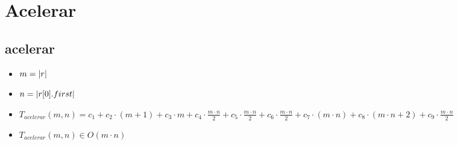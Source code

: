 \documentclass{article}
\begin{document}
    \section*{Acelerar}

    \subsection*{acelerar}

    \begin{minipage}{0.70\textwidth}
        
    \end{minipage}
    \hfill
    \begin{minipage}{0.25\textwidth}
    \end{minipage}

    \begin{itemize}
        \item $m = |r|$
        \item $n = |r[0].first|$
        \item $T_{acelerar}(m, n) = c_1 + 
                                    c_2 \cdot (m+1) +
                                    c_3 \cdot m + 
                                    c_4 \cdot \frac{m \cdot n}{2} +
                                    c_5 \cdot \frac{m \cdot n}{2} +
                                    c_6 \cdot \frac{m \cdot n}{2} +
                                    c_7 \cdot (m \cdot n) +
                                    c_8 \cdot (m \cdot n + 2) +
                                    c_9 \cdot \frac{m \cdot n}{2} $ 
        \item $T_{acelerar}(m, n) \in O(m \cdot n)$
    \end{itemize}
\end{document}
